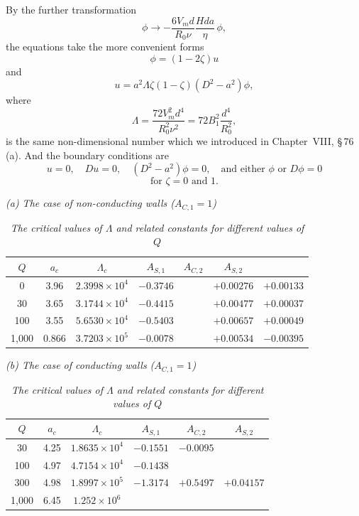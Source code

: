 By the further transformation
\begin{equation}
\phi \to -\frac{6V_m d}{R_0 \nu}\frac{Hda}{\eta}\, \phi, \label{eq:9-305}
\end{equation}
the equations take the more convenient forms
\begin{equation}
[(D^2 - a^2)^2 + Qa^2]\phi = (1 - 2\zeta)u \label{eq:9-306}
\end{equation}
and
\begin{equation}
[(D^2 - a^2)^2 + Qa^2]u = a^2 \Lambda \zeta(1 - \zeta)(D^2 - a^2)\phi, \label{eq:9-307}
\end{equation}
where
\begin{equation}
\Lambda = \frac{72 V_m^2 d^4}{R_0^2 \nu^2} = 72B_1^2 \frac{d^4}{R_0^2}, \label{eq:9-308}
\end{equation}
is the same non-dimensional number which we introduced in Chapter~VIII, \S\,76\,(a). And the boundary conditions are
\begin{equation}
u = 0, \quad Du = 0, \quad (D^2 - a^2)\phi = 0, \quad \text{and either } \phi \text{ or } D\phi = 0 \label{eq:9-309}
\end{equation}
\[
\text{for } \zeta = 0 \text{ and } 1.
\]

\begin{table}[ht]
\centering
\caption*{TABLE XLV}
\caption*{\textit{The critical values of $\Lambda$ and related constants for different values of $Q$}}
\medskip
\textit{(a) The case of non-conducting walls ($A_{C,1} = 1$)}
\begin{tabular}{ccccccc}
\hline
$Q$ & $a_c$ & $\Lambda_c$ & $A_{S,1}$ & $A_{C,2}$ & $A_{S,2}$ \\
\hline
0 & 3.96 & $2.3998 \times 10^4$ & $-0.3746$ & & $+0.00276$ & $+0.00133$ \\
30 & 3.65 & $3.1744 \times 10^4$ & $-0.4415$ & & $+0.00477$ & $+0.00037$ \\
100 & 3.55 & $5.6530 \times 10^4$ & $-0.5403$ & & $+0.00657$ & $+0.00049$ \\
1,000 & 0.866 & $3.7203 \times 10^5$ & $-0.0078$ & & $+0.00534$ & $-0.00395$ \\
\hline
\end{tabular}

\medskip
\textit{(b) The case of conducting walls ($A_{C,1} = 1$)}
\begin{tabular}{cccccc}
\hline
$Q$ & $a_c$ & $\Lambda_c$ & $A_{S,1}$ & $A_{C,2}$ & $A_{S,2}$ \\
\hline
30 & 4.25 & $1.8635 \times 10^4$ & $-0.1551$ & $-0.0095$ & \\
100 & 4.97 & $4.7154 \times 10^4$ & $-0.1438$ & & \\
300 & 4.98 & $1.8997 \times 10^5$ & $-1.3174$ & $+0.5497$ & $+0.04157$ \\
1,000 & 6.45\footnotemark & $1.252 \times 10^6$ & & & \\
\hline
\end{tabular}
\end{table}


